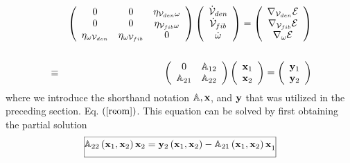 \begin{eqnarray}
&&\left( 
\begin{array}{ccc}
0 & 0 & \eta _{{\cal V}_{den}\omega } \\ 
0 & 0 & \eta _{{\cal V}_{fib}\omega } \\ 
\eta _{\omega {\cal V}_{den}} & \eta _{\omega {\cal V}_{fib}} & 0%
\end{array}%
\right) \left( 
\begin{array}{c}
{\cal \dot{V}}_{den} \\ 
{\cal \dot{V}}_{fib} \\ 
\dot{\omega}%
\end{array}%
\right) =\left( 
\begin{array}{c}
\nabla _{{\cal V}_{den}}{\cal E} \\ 
\nabla _{{\cal V}_{fib}}{\cal E} \\ 
\nabla _{\omega }{\cal E}%
\end{array}%
\right)  \label{reom} \\
&&  \nonumber \\
&\equiv &\qquad \qquad \qquad \left( 
\begin{array}{cc}
0 & {\Bbb A}_{12} \\ 
{\Bbb A}_{21} & {\Bbb A}_{22}%
\end{array}%
\right) \left( 
\begin{array}{c}
{\bf x}_{1} \\ 
{\bf x}_{2}%
\end{array}%
\right) =\left( 
\begin{array}{c}
{\bf y}_{1} \\ 
{\bf y}_{2}%
\end{array}%
\right)
\end{eqnarray}%
where we introduce the shorthand notation ${\Bbb A},{\bf x}$, and ${\bf y}$
that was utilized in the preceding section. Eq. $\left( \ref{reom}\right) $.
This equation can be solved by first obtaining the partial solution 
\begin{equation}
\frame{$%
\mathrel{\mathop{\stackrel{}{{\Bbb A}_{22}\left( {\bf x}_{1},{\bf x}_{2}\right) {\bf x}_{2}={\bf y}_{2}\left( {\bf x}_{1},{\bf x}_{2}\right) -{\Bbb A}_{21}\left( {\bf x}_{1},{\bf x}_{2}\right) {\bf x}}_{1}}\limits_{}}%
$}
\end{equation}%
